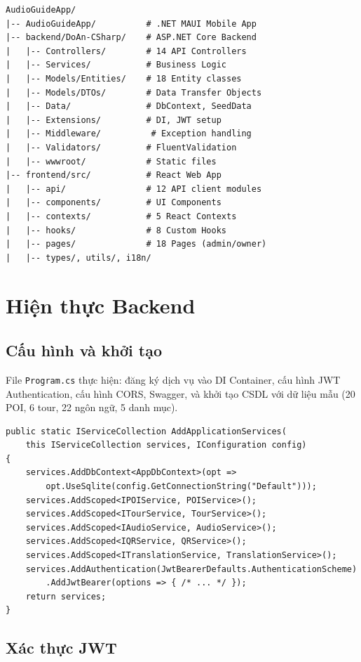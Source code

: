 \documentclass[a4paper,13pt]{report}
\begin{document}
\begin{lstlisting}[language={}]
AudioGuideApp/
|-- AudioGuideApp/          # .NET MAUI Mobile App
|-- backend/DoAn-CSharp/    # ASP.NET Core Backend
|   |-- Controllers/        # 14 API Controllers
|   |-- Services/           # Business Logic
|   |-- Models/Entities/    # 18 Entity classes
|   |-- Models/DTOs/        # Data Transfer Objects
|   |-- Data/               # DbContext, SeedData
|   |-- Extensions/         # DI, JWT setup
|   |-- Middleware/          # Exception handling
|   |-- Validators/         # FluentValidation
|   |-- wwwroot/            # Static files
|-- frontend/src/           # React Web App
|   |-- api/                # 12 API client modules
|   |-- components/         # UI Components
|   |-- contexts/           # 5 React Contexts
|   |-- hooks/              # 8 Custom Hooks
|   |-- pages/              # 18 Pages (admin/owner)
|   |-- types/, utils/, i18n/
\end{lstlisting}

\section{Hiện thực Backend}

\subsection{Cấu hình và khởi tạo}

File \texttt{Program.cs} thực hiện: đăng ký dịch vụ vào DI Container, cấu hình JWT Authentication, cấu hình CORS, Swagger, và khởi tạo CSDL với dữ liệu mẫu (20 POI, 6 tour, 22 ngôn ngữ, 5 danh mục).

\begin{lstlisting}[language={[Sharp]C}, caption={Đăng ký dịch vụ}]
public static IServiceCollection AddApplicationServices(
    this IServiceCollection services, IConfiguration config)
{
    services.AddDbContext<AppDbContext>(opt =>
        opt.UseSqlite(config.GetConnectionString("Default")));
    services.AddScoped<IPOIService, POIService>();
    services.AddScoped<ITourService, TourService>();
    services.AddScoped<IAudioService, AudioService>();
    services.AddScoped<IQRService, QRService>();
    services.AddScoped<ITranslationService, TranslationService>();
    services.AddAuthentication(JwtBearerDefaults.AuthenticationScheme)
        .AddJwtBearer(options => { /* ... */ });
    return services;
}
\end{lstlisting}

\subsection{Xác thực JWT}
\end{document}
